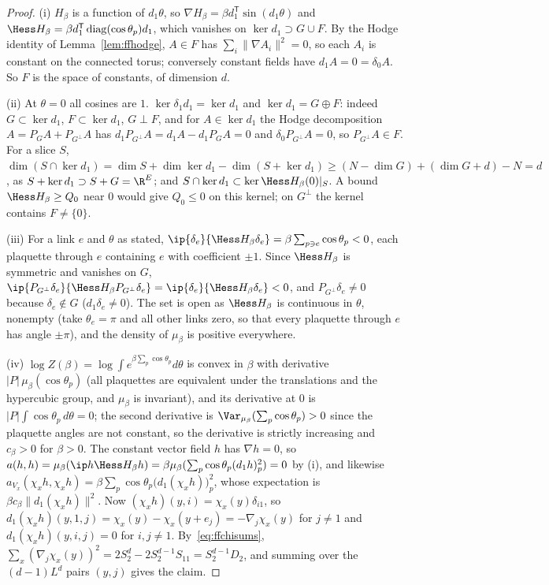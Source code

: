 \begin{proof}
(i) $H_\beta$ is a function of $d_1\theta$, so $\nabla H_\beta=\beta d_1^{
\mathsf T}\sin(d_1\theta)$ and $\Hess H_\beta=\beta d_1^{\mathsf T}\operatorname
{diag}(\cos\theta_p)d_1$, which vanishes on $\ker d_1\supset G\cup F$. By the
Hodge identity of Lemma~\ref{lem:ffhodge}, $A\in F$ has $\sum_i\lVert\nabla
A_i\rVert^2=0$, so each $A_i$ is constant on the connected torus; conversely
constant fields have $d_1A=0=\delta_0A$. So $F$ is the space of constants,
of dimension $d$.

(ii) At $\theta=0$ all cosines are $1$. $\ker\delta_1d_1=\ker d_1$ and $\ker
d_1=G\oplus F$: indeed $G\subset\ker d_1$, $F\subset\ker d_1$, $G\perp F$,
and for $A\in\ker d_1$ the Hodge decomposition $A=P_GA+P_{G^\perp}A$ has
$d_1P_{G^\perp}A=d_1A-d_1P_GA=0$ and $\delta_0P_{G^\perp}A=0$, so $P_{G^\perp}A
\in F$. For a slice $S$, $\dim(S\cap\ker d_1)=\dim S+\dim\ker d_1-\dim(S+
\ker d_1)\ge(N-\dim G)+(\dim G+d)-N=d$, as $S+\ker d_1\supset S+G=\R^E$; and
$S\cap\ker d_1\subset\ker\Hess H_\beta(0)|_S$. A bound $\Hess H_\beta\ge Q_0$
near $0$ would give $Q_0\le0$ on this kernel; on $G^\perp$ the kernel contains
$F\ne\{0\}$.

(iii) For a link $e$ and $\theta$ as stated, $\ip{\delta_e}{\Hess H_\beta
\delta_e}=\beta\sum_{p\ni e}\cos\theta_p<0$, each plaquette through $e$
containing $e$ with coefficient $\pm1$. Since $\Hess H_\beta$ is symmetric and
vanishes on $G$, $\ip{P_{G^\perp}\delta_e}{\Hess H_\beta P_{G^\perp}\delta_e}=
\ip{\delta_e}{\Hess H_\beta\delta_e}<0$, and $P_{G^\perp}\delta_e\ne0$ because
$\delta_e\notin G$ ($d_1\delta_e\ne0$). The set is open as $\Hess H_\beta$ is
continuous in $\theta$, nonempty (take $\theta_e=\pi$ and all other links
zero, so that every plaquette through $e$ has angle $\pm\pi$), and the
density of $\mu_\beta$ is positive everywhere.

(iv) $\log Z(\beta)=\log\int e^{\beta\sum_p\cos\theta_p}d\theta$ is convex
in $\beta$ with derivative $\lvert P\rvert\,\mu_\beta(\cos\theta_p)$ (all
plaquettes are equivalent under the translations and the hypercubic group,
and $\mu_\beta$ is invariant), and its derivative at $0$ is $\lvert P\rvert
\int\cos\theta_p\,d\theta=0$; the second derivative is $\Var_{\mu_\beta}(\sum_p
\cos\theta_p)>0$ since the plaquette angles are not constant, so the
derivative is strictly increasing and $c_\beta>0$ for $\beta>0$. The constant
vector field $h$ has $\nabla h=0$, so $a(h,h)=\mu_\beta(\ip h{\Hess H_\beta
h})=\beta\mu_\beta(\sum_p\cos\theta_p(d_1h)_p^2)=0$ by (i), and likewise
$a_{V_x}(\chi_xh,\chi_xh)=\beta\sum_p\cos\theta_p\bigl(d_1(\chi_xh)\bigr)_p^2$,
whose expectation is $\beta c_\beta\lVert d_1(\chi_xh)\rVert^2$. Now
$(\chi_xh)(y,i)=\chi_x(y)\delta_{i1}$, so $d_1(\chi_xh)(y,1,j)=\chi_x(y)-
\chi_x(y+e_j)=-\nabla_j\chi_x(y)$ for $j\ne1$ and $d_1(\chi_xh)(y,i,j)=0$ for
$i,j\ne1$. By~\eqref{eq:ffchisums}, $\sum_x(\nabla_j\chi_x(y))^2=2S_2^d-
2S_2^{d-1}S_{11}=S_2^{d-1}D_2$, and summing over the $(d-1)L^d$ pairs $(y,j)$
gives the claim.
\end{proof}

